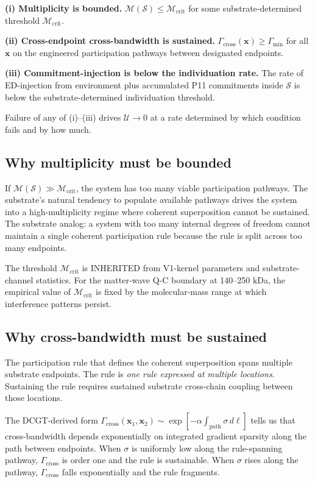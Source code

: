 \documentclass[11pt,a4paper]{article}
\begin{document}
\textbf{(i) Multiplicity is bounded.} $\mathcal{M}(\mathcal{S}) \leq \mathcal{M}_{\mathrm{crit}}$ for some substrate-determined threshold $\mathcal{M}_{\mathrm{crit}}$.

\textbf{(ii) Cross-endpoint cross-bandwidth is sustained.} $\Gamma_{\mathrm{cross}}(\mathbf{x}) \geq \Gamma_{\min}$ for all $\mathbf{x}$ on the engineered participation pathways between designated endpoints.

\textbf{(iii) Commitment-injection is below the individuation rate.} The rate of ED-injection from environment plus accumulated P11 commitments inside $\mathcal{S}$ is below the substrate-determined individuation threshold.

Failure of any of (i)--(iii) drives $\mathcal{U} \to 0$ at a rate determined by which condition fails and by how much.

\subsection{Why multiplicity must be bounded}

If $\mathcal{M}(\mathcal{S}) \gg \mathcal{M}_{\mathrm{crit}}$, the system has too many viable participation pathways. The substrate's natural tendency to populate available pathways drives the system into a high-multiplicity regime where coherent superposition cannot be sustained. The substrate analog: a system with too many internal degrees of freedom cannot maintain a single coherent participation rule because the rule is split across too many endpoints.

The threshold $\mathcal{M}_{\mathrm{crit}}$ is INHERITED from V1-kernel parameters and substrate-channel statistics. For the matter-wave Q-C boundary at 140--250 kDa, the empirical value of $\mathcal{M}_{\mathrm{crit}}$ is fixed by the molecular-mass range at which interference patterns persist.

\subsection{Why cross-bandwidth must be sustained}

The participation rule that defines the coherent superposition spans multiple substrate endpoints. The rule is \emph{one rule expressed at multiple locations}. Sustaining the rule requires sustained substrate cross-chain coupling between those locations.

The DCGT-derived form $\Gamma_{\mathrm{cross}}(\mathbf{x}_1, \mathbf{x}_2) \sim \exp[-\alpha\int_{\mathrm{path}}\sigma\, d\ell]$ tells us that cross-bandwidth depends exponentially on integrated gradient sparsity along the path between endpoints. When $\sigma$ is uniformly low along the rule-spanning pathway, $\Gamma_{\mathrm{cross}}$ is order one and the rule is sustainable. When $\sigma$ rises along the pathway, $\Gamma_{\mathrm{cross}}$ falls exponentially and the rule fragments.
\end{document}
